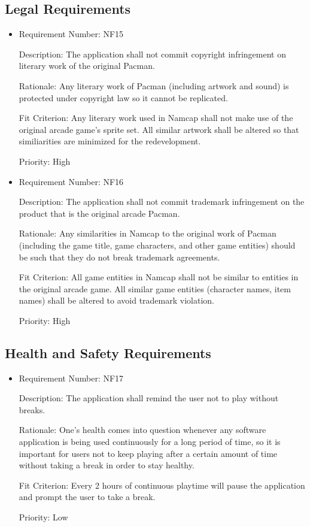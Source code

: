 \documentclass[12pt, titlepage]{article}
\begin{document}
\subsection{Legal Requirements}
\begin{itemize}
	\item
	Requirement Number: NF15

	Description: The application shall not commit copyright infringement on literary work of the original Pacman.

	Rationale: Any literary work of Pacman (including artwork and sound) is protected under copyright law so it cannot be replicated.

	Fit Criterion: Any literary work used in Namcap shall not make use of the original arcade game's sprite set. All similar artwork shall be altered so that similiarities are minimized for the redevelopment.

	Priority: High

	\item
	Requirement Number: NF16

	Description: The application shall not commit trademark infringement on the product that is the original arcade Pacman.

	Rationale: Any similarities in Namcap to the original work of Pacman (including the game title, game characters, and other game entities) should be such that they do not break trademark agreements.

	Fit Criterion: All game entities in Namcap shall not be similar to entities in the original arcade game. All similar game entities (character names, item names) shall be altered to avoid trademark violation.

	Priority: High
\end{itemize}

\subsection{Health and Safety Requirements}
\begin{itemize}
	\item
	Requirement Number: NF17

	Description: The application shall remind the user not to play without breaks.

	Rationale: One's health comes into question whenever any software application is being used continuously for a long period of time, so it is important for users not to keep playing after a certain amount of time without taking a break in order to stay healthy.

	Fit Criterion: Every 2 hours of continuous playtime will pause the application and prompt the user to take a break.

	Priority: Low
\end{itemize}
\end{document}
